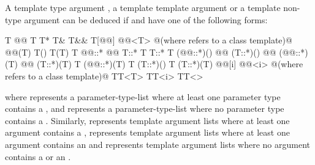 \pnum
A template type argument
,
a template template argument
or a template non-type argument
can be deduced if
and
have one of the following forms:
\begin{codeblock}
T
@\cv{}@ T
T*
T&
T&&
T[@@]
@@<T>  @\textrm{(where  refers to a class template)}@
@@(T)
T()
T(T)
T @@::*
@@ T::*
T T::*
T (@@::*)()
@@ (T::*)()
@@ (@@::*)(T)
@@ (T::*)(T)
T (@@::*)(T)
T (T::*)()
T (T::*)(T)
@@[i]
@@<i>  @\textrm{(where  refers to a class template)}@
TT<T>
TT<i>
TT<>
\end{codeblock}
where
represents
a parameter-type-list
where at least one parameter type contains a
,
and
\tcode{()}
represents
a parameter-type-list
where no parameter type contains a
.
Similarly,
represents template argument lists where at least one argument contains a
,
represents template argument lists where at least one argument contains an
and
\tcode{<>}
represents template argument lists where no argument contains a
or an
.

